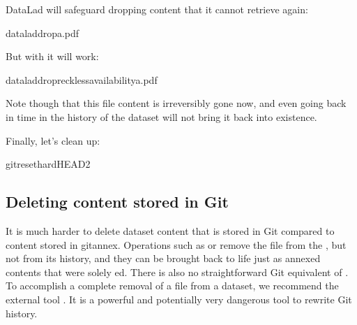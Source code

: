 \sphinxAtStartPar
DataLad will safeguard dropping content that it cannot retrieve again:

\begin{sphinxVerbatim}[commandchars=\\\{\}]
dataladdropa.pdf
\end{sphinxVerbatim}

\sphinxAtStartPar
But with  it will work:

\begin{sphinxVerbatim}[commandchars=\\\{\}]
dataladdrop\PYGZhy{}\PYGZhy{}recklessavailabilitya.pdf
\end{sphinxVerbatim}

\sphinxAtStartPar
Note though that this file content is irreversibly gone now, and
even going back in time in the history of the dataset will not bring it
back into existence.

\sphinxAtStartPar
Finally, let’s clean up:

\begin{sphinxVerbatim}[commandchars=\\\{\}]
gitreset\PYGZhy{}\PYGZhy{}hardHEAD\PYGZti{}2
\end{sphinxVerbatim}


\subsection{Deleting content stored in Git}
\label{\detokenize{basics/101-136-filesystem:deleting-content-stored-in-git}}
\sphinxAtStartPar
It is much harder to delete dataset content that is stored in Git compared to
content stored in git\sphinxhyphen{}annex.
Operations such as  or  remove the file from the ,
but not from its history, and they can be brought back to life just as annexed
contents that were solely \textquotesingle{}ed. There is also no straightforward
Git equivalent of .
To accomplish a complete removal of a file from a dataset, we recommend the external tool
.
It is a powerful and potentially very dangerous tool to rewrite Git history.

